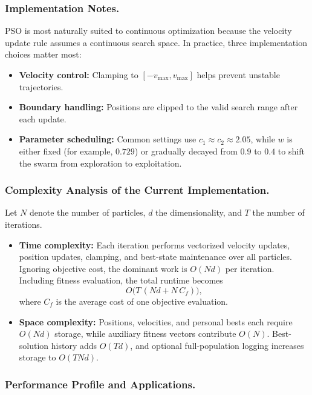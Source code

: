\subsubsection{Implementation Notes.}
PSO is most naturally suited to continuous optimization because the velocity update rule assumes a continuous search space. In practice, three implementation choices matter most:
\begin{itemize}
  \item \textbf{Velocity control:} Clamping to $[-v_{\max}, v_{\max}]$ helps prevent unstable trajectories.
  \item \textbf{Boundary handling:} Positions are clipped to the valid search range after each update.
  \item \textbf{Parameter scheduling:} Common settings use $c_1 \approx c_2 \approx 2.05$, while $w$ is either fixed (for example, $0.729$) or gradually decayed from $0.9$ to $0.4$ to shift the swarm from exploration to exploitation.
\end{itemize}

\subsubsection{Complexity Analysis of the Current Implementation.}
Let $N$ denote the number of particles, $d$ the dimensionality, and $T$ the number of iterations.
\begin{itemize}
  \item \textbf{Time complexity:} Each iteration performs vectorized velocity updates, position updates, clamping, and best-state maintenance over all particles. Ignoring objective cost, the dominant work is $O(Nd)$ per iteration. Including fitness evaluation, the total runtime becomes
  $$
  O\big(T\,(Nd + N\,C_f)\big),
  $$
  where $C_f$ is the average cost of one objective evaluation.
  \item \textbf{Space complexity:} Positions, velocities, and personal bests each require $O(Nd)$ storage, while auxiliary fitness vectors contribute $O(N)$. Best-solution history adds $O(Td)$, and optional full-population logging increases storage to $O(TNd)$.
\end{itemize}

\subsubsection{Performance Profile and Applications.}

